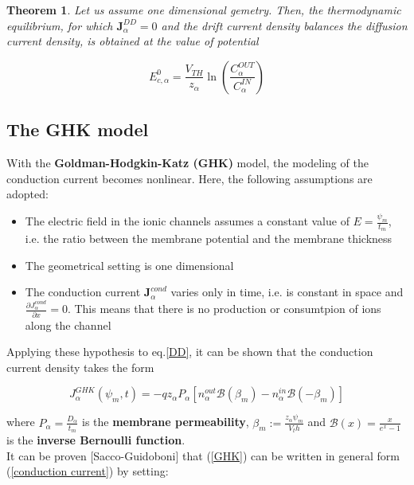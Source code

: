 \documentclass[12pt, a4paper]{article}
\newtheorem{theorem}{Theorem}[section]
\begin{document}
\begin{theorem}
	Let us assume one dimensional gemetry. Then, the thermodynamic equilibrium, for which $\textbf{J}_{\alpha}^{DD} = 0$ and  the drift current density balances the diffusion current density, is obtained at the value of potential
	
	\begin{equation}
	E_{c,\alpha}^0 = \frac{V_{TH}}{z_{\alpha}}\ln\left(\frac{C_{\alpha}^{OUT}}{C_{\alpha}^{IN}}\right)
	\end{equation}	
	
	
\end{theorem}




\subsection{The GHK model}
With the \textbf{Goldman-Hodgkin-Katz (GHK)} model, the modeling of the conduction current becomes nonlinear. Here, the following assumptions are adopted: 

\begin{itemize}
	
	\item The electric field in the ionic channels assumes a constant value of $ E = \frac{\psi_m}{t_m}$, i.e. the ratio between the membrane potential and the membrane thickness
	
	\item The geometrical setting is one dimensional
	
	\item The conduction current $\textbf{J}_{\alpha}^{cond}$ varies only in time, i.e. is constant in space and $ \frac{\partial J_{\alpha}^{cond} }{\partial x} = 0$. This means that there is no production or consumtpion of ions along the channel
	
\end{itemize}

Applying these hypothesis to eq.\ref{DD}, it can be shown that the conduction current density takes the form

\begin{equation}
J_{\alpha}^{GHK}(\psi_m,t) = -qz_{\alpha}P_{\alpha}\left[n_{\alpha}^{out} \mathcal{B}(\beta_m) - n_{\alpha}^{in} \mathcal{B}(-\beta_m) \right] \label{GHK}
\end{equation}

where $P_{\alpha} = \frac{D_{\alpha}}{t_m}$ is the \textbf{membrane permeability}, $ \beta_m := \frac{z_{\alpha} \psi_m}{V_th}$ and $ \mathcal{B}(x) = \frac{x}{e^x -1}$ is the \textbf{inverse Bernoulli function}.\\
It can be proven [Sacco-Guidoboni] that (\ref{GHK}) can be written in general form (\ref{conduction current}) by setting:
\end{document}
